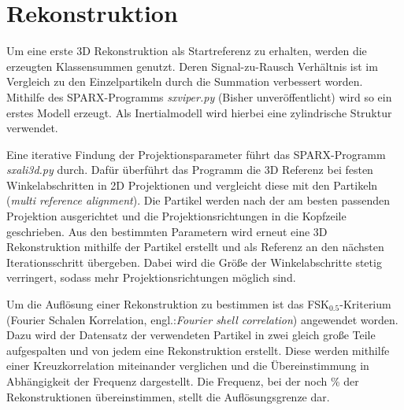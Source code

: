 \section{Rekonstruktion} %
\label{sec:rekonstruktion}

Um eine erste 3D Rekonstruktion als Startreferenz zu erhalten, werden die erzeugten Klassensummen genutzt.
Deren Signal-zu-Rausch Verhältnis ist im Vergleich zu den Einzelpartikeln durch die Summation verbessert worden.
Mithilfe des SPARX-Programms \textit{sxviper.py} (Bisher unveröffentlicht) wird so ein erstes Modell erzeugt.
Als Inertialmodell wird hierbei eine zylindrische Struktur verwendet.

Eine iterative Findung der Projektionsparameter führt das SPARX-Programm \textit{sxali3d.py} durch.
Dafür überführt das Programm die 3D Referenz bei festen Winkelabschritten in 2D Projektionen und vergleicht diese mit den Partikeln (\textit{multi reference alignment}).
Die Partikel werden nach der am besten passenden Projektion ausgerichtet und die Projektionsrichtungen in die Kopfzeile geschrieben.
Aus den bestimmten Parametern wird erneut eine 3D Rekonstruktion mithilfe der Partikel erstellt und als Referenz an den nächsten Iterationsschritt übergeben.
Dabei wird die Größe der Winkelabschritte stetig verringert, sodass mehr Projektionsrichtungen möglich sind.

Um die Auflösung einer Rekonstruktion zu bestimmen ist das FSK$_{0.5}$-Kriterium (Fourier Schalen Korrelation, engl.:\textit{Fourier shell correlation}) angewendet worden.
Dazu wird der Datensatz der verwendeten Partikel in zwei gleich große Teile aufgespalten und von jedem eine Rekonstruktion erstellt.
Diese werden mithilfe einer Kreuzkorrelation miteinander verglichen und die Übereinstimmung in Abhängigkeit der Frequenz dargestellt.
Die Frequenz, bei der noch \unit[50]{\%} der Rekonstruktionen übereinstimmen, stellt die Auflösungsgrenze dar.

\FloatBarrier
